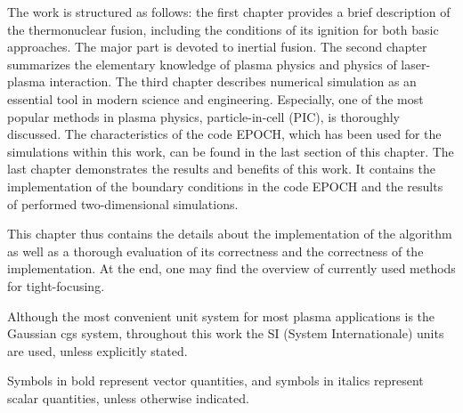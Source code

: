 The work is structured as follows: the first chapter provides a brief description of the thermonuclear fusion, including the conditions of its ignition for both basic approaches. The major part is devoted to inertial fusion. The second chapter summarizes the elementary knowledge of plasma physics and physics of laser-plasma interaction. The third chapter describes numerical simulation as an essential tool in modern science and engineering. Especially, one of the most popular methods in plasma physics, particle-in-cell (PIC), is thoroughly discussed. The characteristics of the code EPOCH\cite{bennett}, which has been used for the simulations within this work, can be found in the last section of this chapter. The last chapter demonstrates the results and benefits of this work. It contains the implementation of the boundary conditions in the code EPOCH and the results of performed two-dimensional simulations.

This chapter thus contains the details about the implementation of the algorithm as well as a thorough evaluation of its correctness and the correctness of the implementation. At the end, one may find the overview of currently used methods for tight-focusing.

Although the most convenient unit system for most plasma applications is the Gaussian cgs system, throughout this work the SI (System Internationale) units are used, unless explicitly stated.

Symbols in bold represent vector quantities, and symbols in italics represent scalar quantities, unless otherwise indicated.
